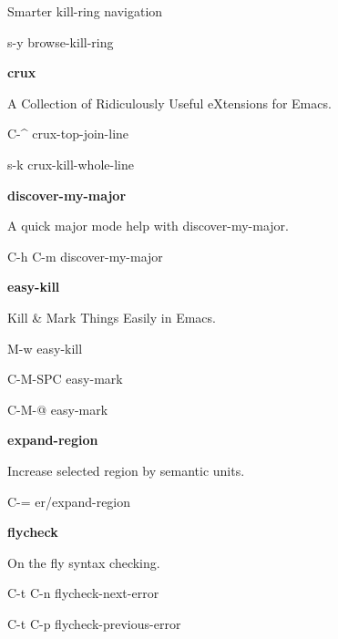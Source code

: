 \documentclass[10pt]{article}
\renewcommand\subsection[1]{\smallskip\par\textbf{\color{heading}#1}}
\newcommand\humanreadable[1]{{\par\color{default}\small\sffamily#1}}
\renewcommand\subsection[1]{\smallskip\par\textbf{\color{heading}#1}}
\newcommand\humanreadable[1]{{\par\color{orange}\small\sffamily#1}}
\begin{document}
\begin{multicols}{4}
  \humanreadable{Smarter kill-ring navigation}
  \begin{keylist}
  \item[s-y] browse-kill-ring
  \end{keylist}

  \subsection{crux}

  \humanreadable{A Collection of Ridiculously Useful eXtensions for Emacs.}
  \begin{keylist}
  \item[C-\^] crux-top-join-line
  \item[s-k] crux-kill-whole-line
  \end{keylist}

  \subsection{discover-my-major}
  \humanreadable{A quick major mode help with discover-my-major.}
  \begin{keylist}
  \item[C-h C-m] discover-my-major
  \end{keylist}

  \subsection{easy-kill}
  \humanreadable{Kill \& Mark Things Easily in Emacs.}
  \begin{keylist}
  \item[M-w] easy-kill
  \item[C-M-SPC] easy-mark
  \item[C-M-@] easy-mark
  \end{keylist}

  \subsection{expand-region}
  \humanreadable{Increase selected region by semantic units.}
  \begin{keylist}
  \item[C-=] er/expand-region
  \end{keylist}

  \subsection{flycheck}
  \humanreadable{On the fly syntax checking.}
  \begin{keylist}
  \item[C-t C-n] flycheck-next-error
  \item[C-t C-p] flycheck-previous-error
  \end{keylist}


\end{multicols}
\end{document}
